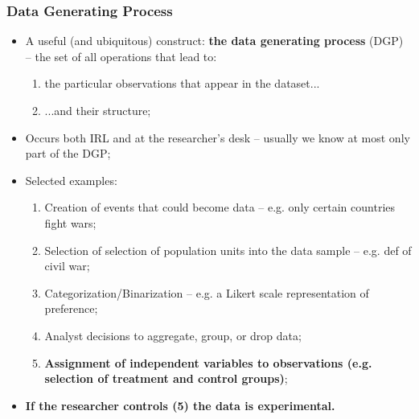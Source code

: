 \documentclass[aspectratio=169]{beamer}
\theoremstyle{principle}
\begin{document}
\begin{frame}
\frametitle{Data Generating Process}

\begin{itemize}
\item A useful (and ubiquitous) construct: \textbf{the data generating process} (DGP) -- the set of all operations that lead to:
\begin{enumerate}
\item the particular observations that appear in the dataset...
\item ...and their structure;
\end{enumerate}
\bigskip
\item Occurs both IRL and at the researcher's desk -- usually we know at most only part of the DGP;
\bigskip
\item Selected examples:
\begin{enumerate}
\item Creation of events that could become data -- e.g. only certain countries fight wars;
\item Selection of selection of population units into the data sample -- e.g. def of civil war;
\item Categorization/Binarization -- e.g. a Likert scale representation of preference;
\item Analyst decisions to aggregate, group, or drop data;
\item \textbf{Assignment of independent variables to observations (e.g. selection of treatment and control groups)};
\end{enumerate}
\bigskip
\item[]\color{white} \textbf{If the researcher controls (5) the data is experimental.}
\end{itemize}

\end{frame}
\end{document}
